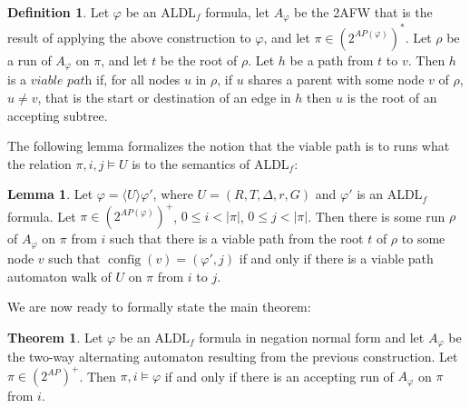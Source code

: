 \documentclass[10pt,a4paper]{amsart}
\theoremstyle{plain}
\theoremstyle{definition}
\newtheorem{theorem}[thm]{Theorem}
\newtheorem{lemma}[thm]{Lemma}
\newtheorem{definition}[thm]{Definition}
\theoremstyle{definition}
\newcommand{\dbox}[1]{\langle #1 \rangle}
\DeclareMathOperator{\config}{config}
\DeclareMathOperator{\?}{?}
\begin{document}
\begin{definition}\label{def:viable_path}
  Let $\varphi$ be an ALDL$_f$ formula, let $A_\varphi$ be the 2AFW that is the result of applying
  the above construction to $\varphi$, and let $\pi \in (2^{AP(\varphi)})^*$. Let $\rho$ be a run of
  $A_\varphi$ on $\pi$, and let $t$ be the root of $\rho$. Let $h$
  be a path from $t$ to $v$. Then $h$ is a $\textit{viable path}$ if, for all nodes $u$ in $\rho$,
  if $u$ shares a parent with some node $v$ of $\rho$, $u \neq v$, that is the start or destination of an edge in $h$ then $u$ is the
  root of an accepting subtree.
\end{definition}

The following lemma formalizes the notion that the viable path is to runs what the relation
$\pi,i,j \models U$ is to the semantics of ALDL$_f$:

\begin{lemma}\label{lem:vpath_iff_vwalk}
    Let $\varphi = \dbox{U}\varphi'$, where $U = (R,T,\Delta,r,G)$ and $\varphi'$ is
    an ALDL$_f$ formula. Let $\pi \in (2^{AP(\varphi)})^+$, $0 \leq i < |\pi|$, $0 \leq j < |\pi|$.
    Then there is some run $\rho$ of $A_{\varphi}$ on $\pi$ from $i$ such that there is a viable path
    from the root $t$ of $\rho$ to some node $v$ such that $\config(v) = (\varphi',j)$ if and only if
    there is a viable path automaton walk of $U$ on $\pi$ from $i$ to $j$.
\end{lemma}

We are now ready to formally state the main theorem:


\begin{theorem}\label{thm:aldlf_2afw_equiv}
  Let $\varphi$
  be an ALDL$_f$ formula in negation normal form and let $A_\varphi$ be the two-way alternating
  automaton resulting from the previous construction. Let $\pi \in (2^{AP})^+$. Then $\pi,i
  \models \varphi$ if and only if there is an accepting run of $A_\varphi$ on $\pi$ from $i$. 
\end{theorem}
\end{document}
